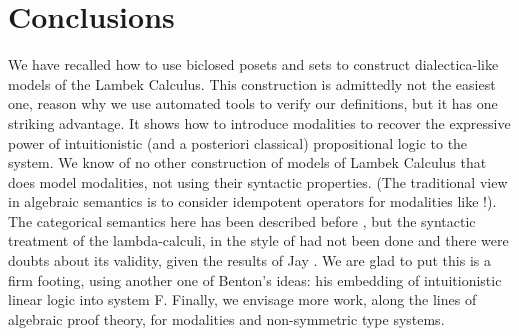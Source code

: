\documentclass{entcs}
\begin{document}
\section{Conclusions}
We have recalled how to use biclosed posets and sets to construct
dialectica-like models of the Lambek Calculus. This construction is
admittedly not the easiest one, reason why we use automated tools to
verify our definitions, but it has one striking advantage. It shows
how to introduce modalities to recover the expressive power of
intuitionistic (and a posteriori classical) propositional logic to the
system. We know of no other construction of models of Lambek Calculus
that does model modalities, not using their syntactic properties. (The
traditional view in algebraic semantics is to consider idempotent
operators for modalities like !). The categorical semantics here has
been described before \cite{depaiva1991}, but the syntactic treatment
of the lambda-calculi, in the style of \cite{benton1993} had not been
done and there were doubts about its validity, given the results of
Jay \cite{jay1991}. We are glad to put this is a firm footing, using
another one of Benton's ideas: his embedding of intuitionistic linear
logic into system F. Finally, we envisage more work, along the lines
of algebraic proof theory, for modalities and non-symmetric type
systems.



\end{document}
